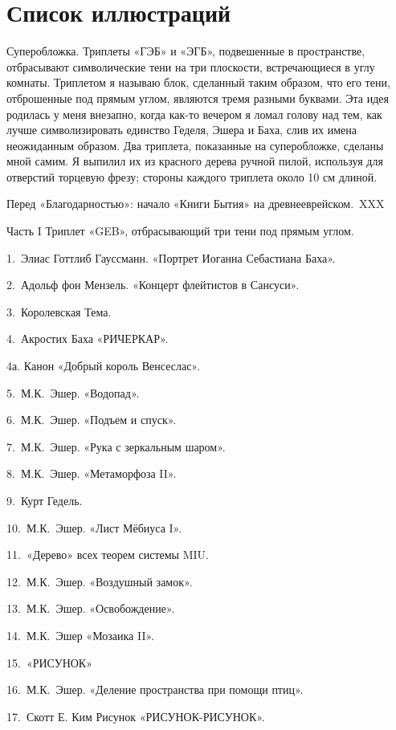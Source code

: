 \documentclass[../main.tex]{subfiles}
\begin{document}

\chapter{Список иллюстраций}

Суперобложка. Триплеты «ГЭБ» и «ЭГБ», подвешенные в пространстве, отбрасывают символические тени на три плоскости, встречающиеся в углу комнаты. Триплетом я называю блок, сделанный таким образом, что его тени, отброшенные под прямым углом, являются тремя разными буквами. Эта идея родилась у меня внезапно, когда как-то вечером я ломал голову над тем, как лучше символизировать единство Геделя, Эшера и Баха, слив их имена неожиданным образом. Два триплета, показанные на суперобложке, сделаны мной самим. Я выпилил их из красного дерева ручной пилой, используя для отверстий торцевую фрезу; стороны каждого триплета около 10 см длиной.

Перед «Благодарностью»: начало «Книги Бытия» на древнееврейском.~XXX

Часть I Триплет «GEB», отбрасывающий три тени под прямым углом.

1.~Элиас Готтлиб Гауссманн. «Портрет Иоганна Себастиана Баха».

2.~Адольф фон Мензель. «Концерт флейтистов в Сансуси».

3.~Королевская Тема.

4.~Акростих Баха «РИЧЕРКАР».

4а. Канон «Добрый король Венсеслас».

5.~М.К.~Эшер. «Водопад».

6.~М.К.~Эшер. «Подъем и спуск».

7.~М.К.~Эшер. «Рука с зеркальным шаром».

8.~М.К.~Эшер. «Метаморфоза II».

9.~Курт Гедель.

10.~М.К.~Эшер. «Лист Мёбиуса I».

11.~«Дерево» всех теорем системы MIU.

12.~М.К.~Эшер. «Воздушный замок».

13.~М.К.~Эшер. «Освобождение».

14.~М.К.~Эшер «Мозаика II».

15.~«РИСУНОК»

16.~М.К.~Эшер. «Деление пространства при помощи птиц».

17.~Скотт Е. Ким Рисунок «РИСУНОК-РИСУНОК».
\end{document}
